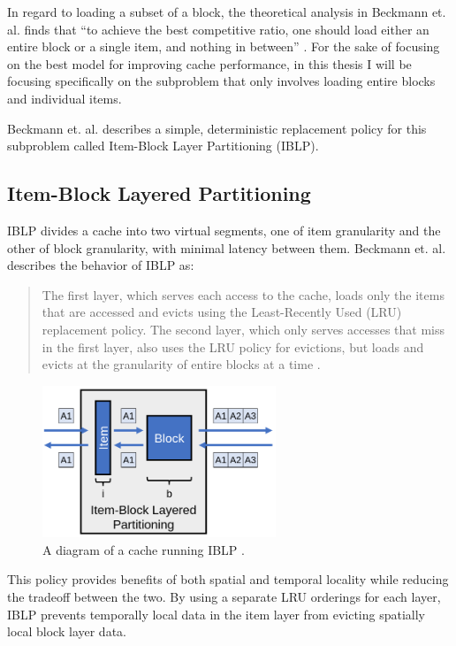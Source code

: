 \documentclass[12pt,twoside]{reedthesis}
\begin{document}
In regard to loading a subset of a block, the theoretical analysis in Beckmann et. al. finds that ``to achieve the best competitive ratio, one should load either an entire block or a single item, and nothing in between'' \cite{beckmann}. For the sake of focusing on the best model for improving cache performance, in this thesis I will be focusing specifically on the subproblem that only involves loading entire blocks and individual items.

Beckmann et. al. describes a simple, deterministic replacement policy for this subproblem called Item-Block Layer Partitioning (IBLP).

	\subsection*{Item-Block Layered Partitioning}

	IBLP divides a cache into two virtual segments, one of item granularity and the other of block granularity, with minimal latency between them. Beckmann et. al. describes the behavior of IBLP as: \begin{quote}
		The first layer, which serves each access to the cache, loads only the items that are accessed and evicts using the Least-Recently Used (LRU) replacement policy. The second layer, which only serves accesses that miss in the first layer, also uses the LRU policy for evictions, but loads and evicts at the granularity of entire blocks at a time \cite{beckmann}.
	\end{quote}

	\begin{figure}[h]
		\centering
		\includegraphics[width=2.75in]{figures/IBLP.png}
		\caption{A diagram of a cache running IBLP \cite{beckmann}.}
	\end{figure}

	This policy provides benefits of both spatial and temporal locality while reducing the tradeoff between the two. By using a separate LRU orderings for each layer, IBLP prevents temporally local data in the item layer from evicting spatially local block layer data.
	
\end{document}

